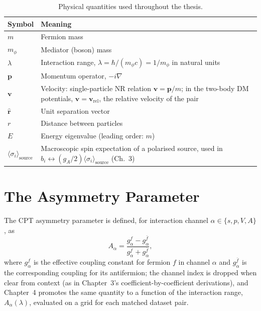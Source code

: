 \documentclass[main]{subfiles}
\begin{document}
\begin{table}[h]
\centering
\begin{tabular}{@{}l>{\raggedright\arraybackslash}p{9.5cm}@{}}
\toprule
Symbol & Meaning \\
\midrule
$m$ & Fermion mass \\
$m_\phi$ & Mediator (boson) mass \\
$\lambda$ & Interaction range, $\lambda=\hbar/(m_\phi c)=1/m_\phi$ in natural units \\
$\mathbf p$ & Momentum operator, $-i\nabla$ \\
$\mathbf v$ & Velocity: single-particle NR relation $\mathbf v=\mathbf p/m$; in the two-body DM potentials, $\mathbf v=\mathbf v_{\text{rel}}$, the relative velocity of the pair \\
$\hat{\mathbf r}$ & Unit separation vector \\
$r$ & Distance between particles \\
$E$ & Energy eigenvalue (leading order: $m$) \\
$\langle\sigma_i\rangle_{\text{source}}$ & Macroscopic spin expectation of a polarised source, used in $b_i\leftrightarrow(g_A/2)\langle\sigma_i\rangle_{\text{source}}$ (Ch.~3) \\
\bottomrule
\end{tabular}
\caption{Physical quantities used throughout the thesis.}
\label{tab:app-physical}
\end{table}

\section{The Asymmetry Parameter}
\label{app:asymmetry}

The CPT asymmetry parameter is defined, for interaction channel
$\alpha\in\{s,p,V,A\}$, as
\begin{equation}
  A_\alpha = \frac{g_\alpha^f-g_\alpha^{\bar f}}{g_\alpha^f+g_\alpha^{\bar f}},
\end{equation}
where $g_\alpha^f$ is the effective coupling constant for fermion $f$ in
channel $\alpha$ and $g_\alpha^{\bar f}$ is the corresponding coupling for
its antifermion; the channel index is dropped when clear from context (as
in Chapter~3's coefficient-by-coefficient derivations), and Chapter~4
promotes the same quantity to a function of the interaction range,
$A_\alpha(\lambda)$, evaluated on a grid for each matched dataset pair.
\end{document}
